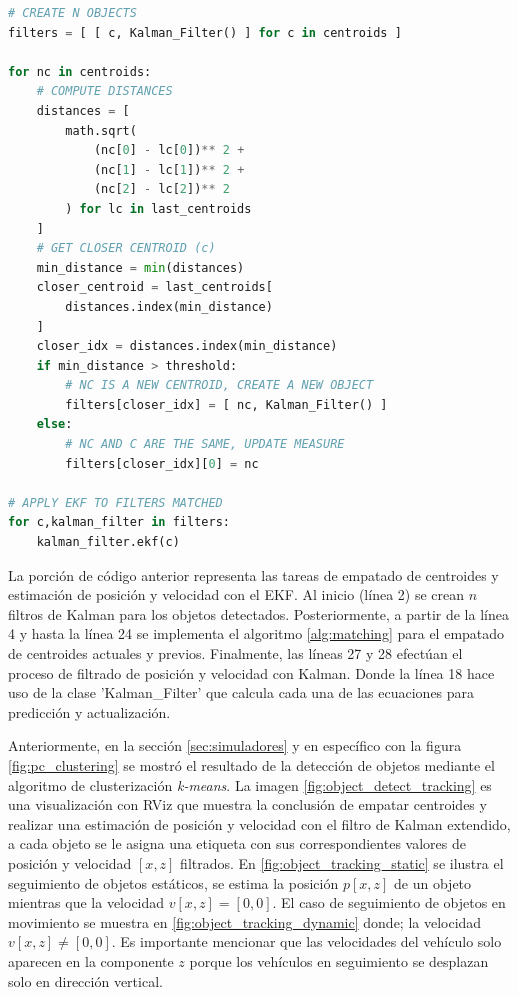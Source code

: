 \begin{lstlisting}[language=Python]
# CREATE N OBJECTS
filters = [ [ c, Kalman_Filter() ] for c in centroids ] 

for nc in centroids:
    # COMPUTE DISTANCES
    distances = [ 
        math.sqrt(
            (nc[0] - lc[0])** 2 + 
            (nc[1] - lc[1])** 2 + 
            (nc[2] - lc[2])** 2 
        ) for lc in last_centroids
    ] 
    # GET CLOSER CENTROID (c)
    min_distance = min(distances)
    closer_centroid = last_centroids[
        distances.index(min_distance)
    ]
    closer_idx = distances.index(min_distance)
    if min_distance > threshold: 
        # NC IS A NEW CENTROID, CREATE A NEW OBJECT
        filters[closer_idx] = [ nc, Kalman_Filter() ] 
    else:
        # NC AND C ARE THE SAME, UPDATE MEASURE
        filters[closer_idx][0] = nc 

# APPLY EKF TO FILTERS MATCHED
for c,kalman_filter in filters:
    kalman_filter.ekf(c)
\end{lstlisting}
\hfill

La porción de código anterior representa las tareas de empatado de centroides y estimación de posición y velocidad con el EKF. Al inicio (línea 2) se crean $n$ filtros de Kalman para los objetos detectados. Posteriormente, a partir de la línea 4 y hasta la línea 24 se implementa el algoritmo \ref{alg:matching} para el empatado de centroides actuales y previos. Finalmente, las líneas 27 y 28 efectúan el proceso de filtrado de posición y velocidad con Kalman. Donde la línea 18 hace uso de la clase 'Kalman\_Filter' que calcula cada una de las ecuaciones para predicción y actualización.

Anteriormente, en la sección \ref{sec:simuladores} y en específico con la figura \ref{fig:pc_clustering} se mostró el resultado de la detección de objetos mediante el algoritmo de clusterización \textit{k-means}. La imagen \ref{fig:object_detect_tracking} es una visualización con RViz que muestra la conclusión de empatar centroides y realizar una estimación de posición y velocidad con el filtro de Kalman extendido, a cada objeto se le asigna una etiqueta con sus correspondientes valores de posición y velocidad $[x, z]$ filtrados. En \ref{fig:object_tracking_static} se ilustra el seguimiento de objetos estáticos, se estima la posición $p[x, z]$ de un objeto mientras que la velocidad $v[x, z] = [0, 0]$. El caso de seguimiento de objetos en movimiento se muestra en \ref{fig:object_tracking_dynamic} donde; la velocidad $v[x, z] \neq [0, 0]$. Es importante mencionar que las velocidades del vehículo solo aparecen en la componente $z$ porque los vehículos en seguimiento se desplazan solo en dirección vertical.

